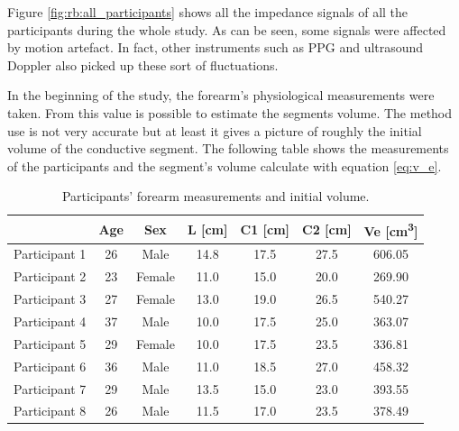 
Figure \ref{fig:rb:all_participants} shows all the impedance signals of all the participants during the whole study. As can be seen, some signals were affected by motion artefact. In fact, other instruments such as PPG and ultrasound Doppler also picked up these sort of fluctuations. 

In the beginning of the study, the forearm's physiological measurements were taken. From this value is possible to estimate the segments volume. The method use is not very accurate but at least it gives a picture of roughly the initial volume of the conductive segment. The following table shows the measurements of the participants and the segment's volume calculate with equation \ref{eq:v_e}.

\begin{table}[htbp]
	\caption{Participants' forearm measurements and initial volume.}
	\label{tbl:measurments}
	\centering
	\begin{tabular}{lcccccc}
		\toprule
		              & \textbf{Age} &  \textbf{Sex}   &  \textbf{L [\si{\cm}]}   &  \textbf{C1 [\si{\cm}]}  &  \textbf{C2 [\si{\cm}]}  &   \textbf{Ve [\si{\cubic\cm}]}   \\\midrule
		Participant 1 & 26  &  Male  & 14.8 & 17.5 & 27.5 & 606.05 \\
		Participant 2 & 23  & Female & 11.0 & 15.0 & 20.0 & 269.90 \\
		Participant 3 & 27  & Female & 13.0 & 19.0 & 26.5 & 540.27 \\
		Participant 4 & 37  &  Male  & 10.0 & 17.5 & 25.0 & 363.07 \\
		Participant 5 & 29  & Female & 10.0 & 17.5 & 23.5 & 336.81 \\
		Participant 6 & 36  &  Male  & 11.0 & 18.5 & 27.0 & 458.32 \\
		Participant 7 & 29  &  Male  & 13.5 & 15.0 & 23.0 & 393.55 \\
		Participant 8 & 26  &  Male  & 11.5 & 17.0 & 23.5 & 378.49 \\ \bottomrule
	\end{tabular}
\end{table}


